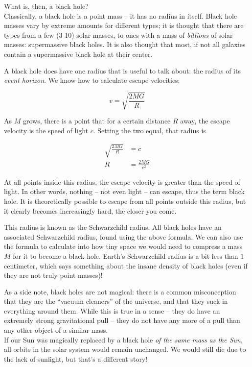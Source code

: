 What is, then, a black hole?\\
Classically, a black hole is a point mass -- it has no radius in itself. Black hole masses vary by extreme amounts for different types; it is thought that there are types from a few (3-10) solar masses, to ones with a mass of \emph{billions} of solar masses: supermassive black holes. It is also thought that most, if not all galaxies contain a supermassive black hole at their center.

A black hole does have one radius that is useful to talk about: the radius of its \emph{event horizon}. We know how to calculate escape velocities:

\begin{equation}
v = \sqrt{\frac{2 M G}{R}}
\end{equation}

As $M$ grows, there is a point that for a certain distance $R$ away, the escape velocity is the speed of light $c$. Setting the two equal, that radius is

\begin{align}
\sqrt{\frac{2 M G}{R}} &= c\\
R &= \frac{2 M G}{c^2}
\end{align}

At all points inside this radius, the escape velocity is greater than the speed of light. In other words, nothing -- not even light -- can escape, thus the term black hole. It is theoretically possible to escape from all points outside this radius, but it clearly becomes increasingly hard, the closer you come.

This radius is known as the Schwarzchild radius. All black holes have an associated Schwarzchild radius, found using the above formula. We can also use the formula to calculate into how tiny space we would need to compress a mass $M$ for it to become a black hole. Earth's Schwarzchild radius is a bit less than 1 centimeter, which says something about the insane density of black holes (even if they are not truly point masses)!

As a side note, black holes are not magical: there is a common misconception that they are the ``vacuum cleaners'' of the universe, and that they suck in everything around them. While this is true in a sense -- they do have an extremely strong gravitational pull -- they do not have any more of a pull than any other object of a similar mass.\\
If our Sun was magically replaced by a black hole \emph{of the same mass as the Sun}, all orbits in the solar system would remain unchanged. We would still die due to the lack of sunlight, but that's a different story!

